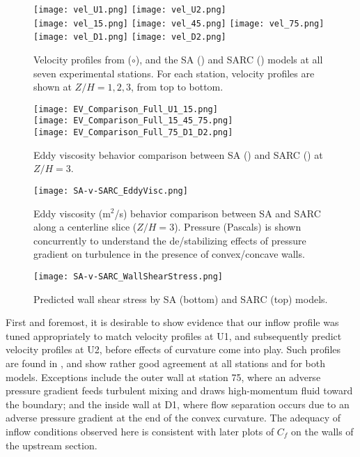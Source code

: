 \documentclass[11pt]{article}
\begin{document}
\begin{figure}[p]
\centering
\texttt{[image: vel\_U1.png]}
\texttt{[image: vel\_U2.png]}\\
\texttt{[image: vel\_15.png]}
\texttt{[image: vel\_45.png]}
\texttt{[image: vel\_75.png]}\\
\texttt{[image: vel\_D1.png]}
\texttt{[image: vel\_D2.png]}
\caption{Velocity profiles from \citet{kim1994} ($\circ$), and the SA ({\color{blue}\solidrule[6mm]}) and SARC ({\color{red}\dashrule}) models at all seven experimental stations. For each station, velocity profiles are shown at $Z/H = 1, 2, 3$, from top to bottom.}
\label{fig:velocity_slices}
\end{figure}

\begin{figure}[p]
\centering
\texttt{[image: EV\_Comparison\_Full\_U1\_15.png]}\\
\texttt{[image: EV\_Comparison\_Full\_15\_45\_75.png]}\\
\texttt{[image: EV\_Comparison\_Full\_75\_D1\_D2.png]}
\caption{Eddy viscosity behavior comparison between SA (\solidrule[6mm]) and SARC (\dashrule) at $Z/H=3$.}
\label{fig:ev_lines}
\end{figure}

\begin{figure}[t!]
\centering
\texttt{[image: SA-v-SARC\_EddyVisc.png]}
\caption{Eddy viscosity (m$^2$/s) behavior comparison between SA and SARC along a centerline slice ($Z/H=3$). Pressure (Pascals) is shown concurrently to understand the de/stabilizing effects of pressure gradient on turbulence in the presence of convex/concave walls.}
\label{fig:ev_slices}
\end{figure}

\begin{figure}[t!]
\centering
\texttt{[image: SA-v-SARC\_WallShearStress.png]}
\caption{Predicted wall shear stress by SA (bottom) and SARC (top) models.}
\label{fig:wss}
\end{figure}

First and foremost, it is desirable to show evidence that our inflow profile was tuned appropriately to match velocity profiles at U1, and subsequently predict velocity profiles at U2, before effects of curvature come into play. Such profiles are found in , and show rather good agreement at all stations and for both models. Exceptions include the outer wall at station 75, where an adverse pressure gradient feeds turbulent mixing and draws high-momentum fluid toward the boundary; and the inside wall at D1, where flow separation occurs due to an adverse pressure gradient at the end of the convex curvature. The adequacy of inflow conditions observed here is consistent with later plots of $C_f$ on the walls of the upstream section.
\end{document}
